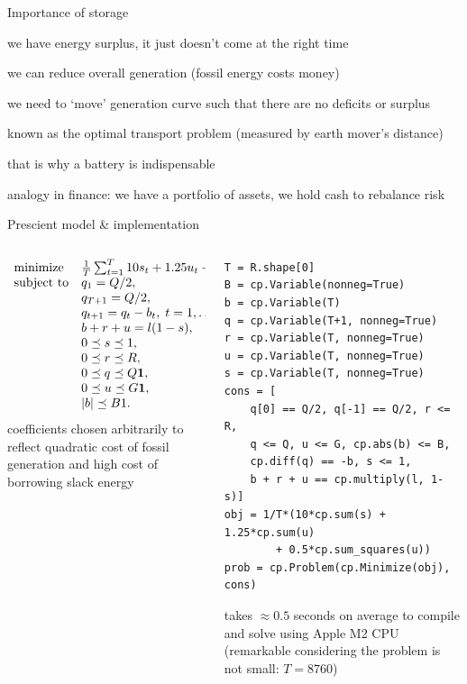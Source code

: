 \documentclass[aspectratio=169,11pt]{beamer}
\begin{document}
\begin{frame}{Importance of storage}
    \BIT
    \item we have energy surplus, it just doesn't come at the right time
    \item we can reduce overall generation (fossil energy costs money)
    \item we need to `move' generation curve such that there are no deficits or surplus
    \item known as the optimal transport problem (measured by earth mover's distance)
    \item that is why a battery is indispensable
    \item analogy in finance: we have a portfolio of assets, we hold cash to rebalance risk
    \EIT
\end{frame}

\begin{frame}[fragile]{Prescient model \& implementation}
    \begin{columns}
        \begin{column}{0.46\textwidth}
    \[
        \begin{array}{ll}
            \mbox{minimize}   &  \frac{1}{T}\sum_{t=1}^{T} 10 s_t + 1.25 u_t + 0.5 u_t^2 \\
            \mbox{subject to} & q_1 = Q/2, \\
            & q_{T+1} = Q/2, \\
            & q_{t+1} = q_t - b_t, \; t = 1, \ldots, T, \\
            & b + r + u = l(1-s), \\
            & 0 \preceq s \preceq 1, \\
            & 0 \preceq r \preceq R, \\
            & 0 \preceq q \preceq Q \mathbf 1, \\
            & 0 \preceq u \preceq G \mathbf 1, \\
            & |b| \preceq B 1.
        \end{array}
    \]
    \vfill
    coefficients chosen arbitrarily to reflect 
    quadratic cost of fossil generation and high cost of 
    borrowing slack energy 
    \end{column}
    \begin{column}{0.54\textwidth}
\begin{lstlisting}[language=mypython, basicstyle=\footnotesize\ttfamily, belowskip=0em]
T = R.shape[0]
B = cp.Variable(nonneg=True)
b = cp.Variable(T)
q = cp.Variable(T+1, nonneg=True)
r = cp.Variable(T, nonneg=True)
u = cp.Variable(T, nonneg=True)
s = cp.Variable(T, nonneg=True)
cons = [
    q[0] == Q/2, q[-1] == Q/2, r <= R,
    q <= Q, u <= G, cp.abs(b) <= B,
    cp.diff(q) == -b, s <= 1,
    b + r + u == cp.multiply(l, 1-s)]
obj = 1/T*(10*cp.sum(s) + 1.25*cp.sum(u) 
        + 0.5*cp.sum_squares(u))
prob = cp.Problem(cp.Minimize(obj), cons)
\end{lstlisting}
    \vfill
    takes $\approx0.5$ seconds on average to compile and solve using Apple M2 CPU
    (remarkable considering the problem is not small: $T=8760$)
    \end{column}
    \end{columns}
\end{frame}
\end{document}
